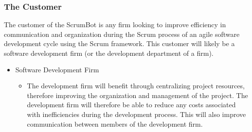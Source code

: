 \documentclass[12pt, titlepage]{article}
\begin{document}
\subsubsection{The Customer}
The customer of the ScrumBot is any firm looking to improve efficiency in communication and organization during the Scrum process of an agile software development cycle using the Scrum framework. This customer will likely be a software development firm (or the development department of a firm).

\begin{itemize}
    \item Software Development Firm
    \begin{itemize}
      \item[] The development firm will benefit through centralizing project resources, therefore improving the organization and management of the project. The development firm will therefore be able to reduce any costs associated with inefficiencies during the development process. This will also improve communication between members of the development firm.
    \end{itemize}
\end{itemize}
\end{document}
